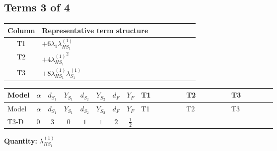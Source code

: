 \documentclass[8pt]{article}
\begin{document}
\begin{landscape}
\subsection*{Terms 3 of 4}
\begin{center}
\begin{tabular}{@{}c >{\raggedright\arraybackslash}p{0.82\linewidth}@{}}
\toprule
Column & Representative term structure \\
\midrule
T1 & \(\displaystyle +6 {\lambda_1} {\lambda_{HS_1}^{(1)}}\) \\
\midrule
T2 & \(\displaystyle +4 {\lambda_{HS_1}^{(1)}}^2\) \\
\midrule
T3 & \(\displaystyle +8 {\lambda_{HS_1}^{(1)}} {\lambda_{S_1}^{(1)}}\) \\
\midrule
\bottomrule
\end{tabular}
\end{center}
\smallskip
\tiny
\begin{longtable}{@{}llcccccc >{\raggedright\arraybackslash}p{0.21\linewidth} >{\raggedright\arraybackslash}p{0.21\linewidth} >{\raggedright\arraybackslash}p{0.21\linewidth}@{}}
\toprule
Model & $\alpha$ & $d_{S_1}$ & $Y_{S_1}$ & $d_{S_2}$ & $Y_{S_2}$ & $d_F$ & $Y_F$ & T1 & T2 & T3 \\
\midrule
\endfirsthead
\toprule
Model & $\alpha$ & $d_{S_1}$ & $Y_{S_1}$ & $d_{S_2}$ & $Y_{S_2}$ & $d_F$ & $Y_F$ & T1 & T2 & T3 \\
\midrule
\endhead
T3-D & $0$ & $3$ & $0$ & $1$ & $1$ & $2$ & $\frac{1}{2}$ & \scriptsize\adjustbox{max width=\linewidth}{$\begin{gathered} +6 {\lambda_1} {\lambda_{HS_1}^{(1)}}\end{gathered}$} & \scriptsize\adjustbox{max width=\linewidth}{$\begin{gathered} +4 {\lambda_{HS_1}^{(1)}}^2\end{gathered}$} & \scriptsize\adjustbox{max width=\linewidth}{$\begin{gathered} +8 {\lambda_{HS_1}^{(1)}} {\lambda_{S_1}^{(1)}}\end{gathered}$} \\
\midrule
\bottomrule
\end{longtable}
\clearpage
\noindent\textbf{Quantity: }$\lambda_{HS_1}^{(1)}$\par\smallskip

\end{landscape}
\end{document}
